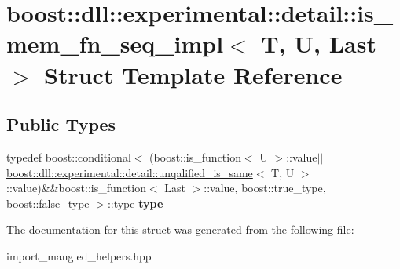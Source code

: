 \hypertarget{a00178}{}\section{boost\+:\+:dll\+:\+:experimental\+:\+:detail\+:\+:is\+\_\+mem\+\_\+fn\+\_\+seq\+\_\+impl$<$ T, U, Last $>$ Struct Template Reference}
\label{a00178}
\subsection*{Public Types}
\begin{DoxyCompactItemize}
\item 
typedef boost\+::conditional$<$ (boost\+::is\+\_\+function$<$ U $>$\+::value$\vert$$\vert$\hyperlink{a00325}{boost\+::dll\+::experimental\+::detail\+::unqalified\+\_\+is\+\_\+same}$<$ T, U $>$\+::value)\&\&boost\+::is\+\_\+function$<$ Last $>$\+::value, boost\+::true\+\_\+type, boost\+::false\+\_\+type $>$\+::type {\bfseries type}\hypertarget{a00178_a4689022563a599f3389c7defc6210274}{}\label{a00178_a4689022563a599f3389c7defc6210274}

\end{DoxyCompactItemize}


The documentation for this struct was generated from the following file\+:\begin{DoxyCompactItemize}
\item 
import\+\_\+mangled\+\_\+helpers.\+hpp\end{DoxyCompactItemize}
